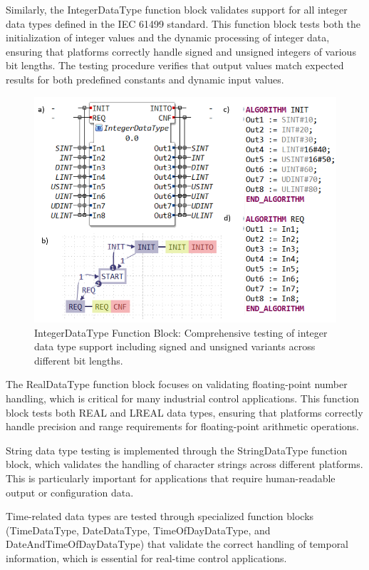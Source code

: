 Similarly, the IntegerDataType function block validates support for all integer data types defined in the IEC 61499 standard. This function block tests both the initialization of integer values and the dynamic processing of integer data, ensuring that platforms correctly handle signed and unsigned integers of various bit lengths. The testing procedure verifies that output values match expected results for both predefined constants and dynamic input values.

\begin{figure}[!htbp]
    \centering
    \includegraphics[width=0.8\columnwidth]{MX_Papers/Paper8/Figures/IDT.PNG}
    \caption{IntegerDataType Function Block: Comprehensive testing of integer data type support including signed and unsigned variants across different bit lengths.}
    \label{fig:integer_test}
\end{figure}

The RealDataType function block focuses on validating floating-point number handling, which is critical for many industrial control applications. This function block tests both REAL and LREAL data types, ensuring that platforms correctly handle precision and range requirements for floating-point arithmetic operations.

String data type testing is implemented through the StringDataType function block, which validates the handling of character strings across different platforms. This is particularly important for applications that require human-readable output or configuration data.

Time-related data types are tested through specialized function blocks (TimeDataType, DateDataType, TimeOfDayDataType, and DateAndTimeOfDayDataType) that validate the correct handling of temporal information, which is essential for real-time control applications.

